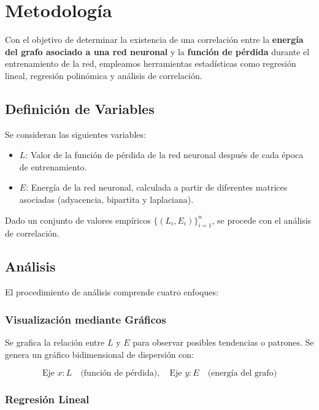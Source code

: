 \documentclass{article}
\begin{document}
\section{Metodología}

Con el objetivo de determinar la existencia de una correlación entre la \textbf{energía del grafo asociado a una red neuronal} y la \textbf{función de pérdida} durante el entrenamiento de la red, empleamos herramientas estadísticas como regresión lineal, regresión polinómica y análisis de correlación.

\subsection{Definición de Variables}

Se consideran las siguientes variables:

\begin{itemize}
    \item \( L \): Valor de la función de pérdida de la red neuronal después de cada época de entrenamiento.
    \item \( E \): Energía de la red neuronal, calculada a partir de diferentes matrices asociadas (adyacencia, bipartita y laplaciana).
\end{itemize}

Dado un conjunto de valores empíricos \(\{ (L_i, E_i) \}_{i=1}^{n} \), se procede con el análisis de correlación.

\subsection{Análisis}

El procedimiento de análisis comprende cuatro enfoques:

\subsubsection{Visualización mediante Gráficos}

Se grafica la relación entre \( L \) y \( E \) para observar posibles tendencias o patrones. Se genera un gráfico bidimensional de dispersión con:

\[
\text{Eje } x: L \quad \text{(función de pérdida)}, \quad
\text{Eje } y: E \quad \text{(energía del grafo)}
\]

\subsubsection{Regresión Lineal}
\end{document}
